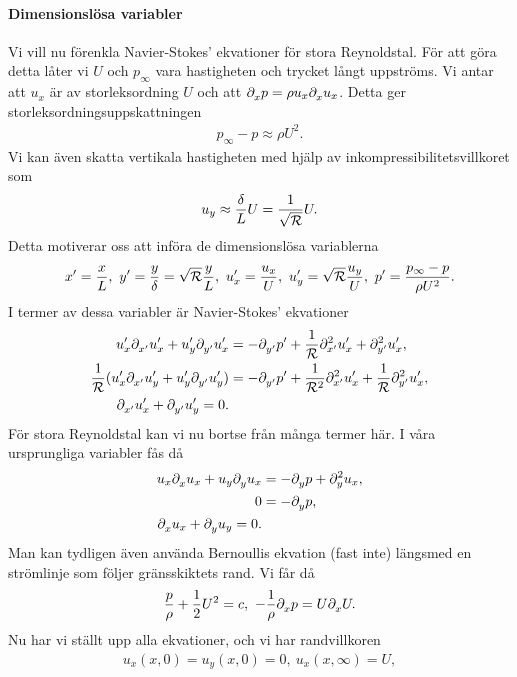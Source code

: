 \paragraph{Dimensionslösa variabler}
Vi vill nu förenkla Navier-Stokes' ekvationer för stora Reynoldstal. För att göra detta låter vi $U$ och $p_{\infty}$ vara hastigheten och trycket långt uppströms. Vi antar att $u_{x}$ är av storleksordning $U$ och att $\del{x}{p} = \rho u_{x}\del{x}{u_{x}}$. Detta ger storleksordningsuppskattningen
\begin{align*}
	p_{\infty} - p \approx \rho U^{2}.
\end{align*}
Vi kan även skatta vertikala hastigheten med hjälp av inkompressibilitetsvillkoret som
\begin{align*}
	u_{y} \approx \frac{\delta}{L}U = \frac{1}{\sqrt{\rey}}U.
\end{align*}
Detta motiverar oss att införa de dimensionslösa variablerna
\begin{align*}
	x' = \frac{x}{L},\ y' = \frac{y}{\delta} = \sqrt{\rey}\frac{y}{L},\ u_{x}' = \frac{u_{x}}{U},\ u_{y}' = \sqrt{\rey}\frac{u_{y}}{U},\ p' = \frac{p_{\infty} - p}{\rho U^{2}}.
\end{align*}
I termer av dessa variabler är Navier-Stokes' ekvationer
\begin{align*}
	u_{x}'\del{x'}{u_{x}'} + u_{y}'\del{y'}{u_{x}'}                 &= -\del{y'}{p'} + \frac{1}{\rey}\del[2]{x'}{u_{x}'} + \del[2]{y'}{u_{x}'}, \\
	\frac{1}{\rey}(u_{x}'\del{x'}{u_{y}'} + u_{y}'\del{y'}{u_{y}'}) &= -\del{y'}{p'} + \frac{1}{\rey^{2}}\del[2]{x'}{u_{x}'} + \frac{1}{\rey}\del[2]{y'}{u_{x}'}, \\
	\del{x'}{u_{x}'} + \del{y'}{u_{y}'} = 0.
\end{align*}
För stora Reynoldstal kan vi nu bortse från många termer här. I våra ursprungliga variabler fås då
\begin{align*}
	u_{x}\del{x}{u_{x}} + u_{y}\del{y}{u_{x}}                 &= -\del{y}{p} + \del[2]{y}{u_{x}}, \\
	0                                                         &= -\del{y}{p}, \\
	\del{x}{u_{x}} + \del{y}{u_{y}} = 0.
\end{align*}
Man kan tydligen även använda Bernoullis ekvation (fast inte) längsmed en strömlinje som följer gränsskiktets rand. Vi får då
\begin{align*}
	\frac{p}{\rho} + \frac{1}{2}U^{2} = c,\ -\frac{1}{\rho}\del{x}{p} = U\del{x}{U}.
\end{align*}
Nu har vi ställt upp alla ekvationer, och vi har randvillkoren
\begin{align*}
	u_{x}(x, 0) = u_{y}(x, 0) = 0,\ u_{x}(x, \infty) = U,
\end{align*}

